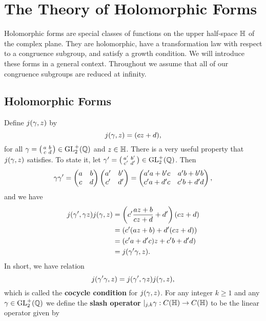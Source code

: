 \chapter{The Theory of Holomorphic Forms}
  Holomorphic forms are special classes of functions on the upper half-space $\mathbb{H}$ of the complex plane. They are holomorphic, have a transformation law with respect to a congruence subgroup, and satisfy a growth condition. We will introduce these forms in a general context. Throughout we assume that all of our congruence subgroups are reduced at infinity.
  \section{Holomorphic Forms}
    Define $j(\gamma,z)$ by
    \[
      j(\gamma,z) = (cz+d),
    \]
    for all $\gamma = \begin{psmallmatrix} a & b \\ c & d \end{psmallmatrix} \in \mathrm{GL}_{2}^{+}(\mathbb{Q})$ and $z \in \mathbb{H}$. There is a very useful property that $j(\gamma,z)$ satisfies. To state it, let $\gamma' = \begin{psmallmatrix} a' & b' \\ c' & d' \end{psmallmatrix} \in \mathrm{GL}_{2}^{+}(\mathbb{Q})$. Then
    \[
      \gamma\gamma' = \begin{pmatrix} a & b \\ c & d \end{pmatrix}\begin{pmatrix} a' & b' \\ c' & d' \end{pmatrix} = \begin{pmatrix} a'a+b'c & a'b+b'b \\ c'a+d'c & c'b+d'd \end{pmatrix},
    \]
    and we have
    \begin{align*}
      j(\gamma',\gamma z)j(\gamma,z) &= \left(c'\frac{az+b}{cz+d}+d'\right)(cz+d) \\
      &= (c'(az+b)+d'(cz+d)) \\
      &= (c'a+d'c)z+c'b+d'd) \\
      &= j(\gamma'\gamma,z).
    \end{align*}
    In short, we have relation
    \[
      j(\gamma'\gamma,z) =  j(\gamma',\gamma z)j(\gamma,z),
    \]
    which is called the \textbf{cocycle condition} for $j(\gamma,z)$. For any integer $k \ge 1$ and any $\gamma \in \mathrm{GL}_{2}^{+}(\mathbb{Q})$ we define the \textbf{slash operator} $|_{j,k}\gamma:C(\mathbb{H}) \to C(\mathbb{H})$ to be the linear operator given by
